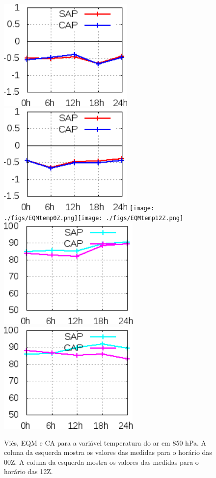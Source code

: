 \begin{figure}[!hbp]
\includegraphics[height=5.5cm]{./figs/VIES850temp0Z.png}\includegraphics[height=5.5cm]{./figs/VIES850temp12Z.png}
\texttt{[image: ./figs/EQMtemp0Z.png]}\texttt{[image: ./figs/EQMtemp12Z.png]}
\includegraphics[height=5.5cm]{./figs/CA850temp0Z.png}\includegraphics[height=5.5cm]{./figs/CA850temp12Z.png}
\caption{Viés, EQM e CA para a variável temperatura do ar em 850 hPa. A coluna da esquerda mostra os valores das medidas para o horário das 00Z. A coluna da esquerda mostra os valores das medidas para o horário das 12Z.}
\label{fig11}
\end{figure}

